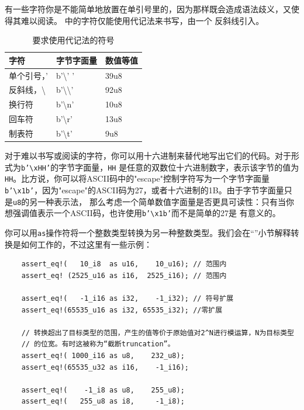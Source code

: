 \medskip
有一些字符你是不能简单地放置在单引号里的，因为那样既会造成语法歧义，又使得其难以阅读。 中的字符仅能使用代记法来书写，由一个
反斜线引入。

\smallskip
\begin{table}[h]
    \small
    \caption{要求使用代记法的符号}\label{TABLE3-6}
    \begin{tabularx}{\linewidth}{X X X}
        \toprule
        \textbf{字符} & \textbf{字节字面量} & \textbf{数值等值} \\
        \midrule
        单个引号，' & b'{\textbackslash}' ' & 39u8 \\
        反斜线，{\textbackslash} & b'\textbackslash\textbackslash' & 92u8 \\
        换行符 & b'{\textbackslash}n' & 10u8 \\
        回车符 & b'{\textbackslash}r' & 13u8 \\
        制表符 & b'{\textbackslash}t' & 9u8 \\
        \bottomrule
    \end{tabularx}
\end{table}

\smallskip
对于难以书写或阅读的字符，你可以用十六进制来替代地写出它们的代码。对于形式为\texttt{b'{\textbackslash}xHH'}的字节字面量，\texttt{HH}
是任意的双数位十六进制数字，表示该字节的值为\texttt{HH}。比方说，你可以将ASCII码中的"escape"控制字符写为一个字节字面量
\texttt{b'{\textbackslash}x1b'}，因为"escape"的ASCII码为27，或者十六进制的1B。由于字节字面量只是\texttt{u8}的另一种表示法，
那么考虑一个简单数值字面量是否更具可读性：只有当你想强调值表示一个ASCII码，也许使用\texttt{b'{\textbackslash}x1b'}而不是简单的27是
有意义的。

\medskip
你可以用\texttt{as}操作符将一个整数类型转换为另一种整数类型。我们会在“”小节解释转换是如何工作的，不过这里有一些示例：
\begin{verbatim}
    assert_eq!(   10_i8  as u16,    10_u16); // 范围内
    assert_eq! (2525_u16 as i16,  2525_i16); // 范围内
    
    assert_eq!(   -1_i16 as i32,    -1_i32); // 符号扩展
    assert_eq!(65535_u16 as i32, 65535_i32); //零扩展

    // 转换超出了目标类型的范围，产生的值等价于原始值对2^N进行模运算，N为目标类型
    // 的位宽。有时这被称为“截断truncation”。
    assert_eq!( 1000_i16 as u8,    232_u8);
    assert_eq!(65535_u32 as i16,    -1_i16);

    assert_eq!(    -1_i8 as u8,    255_u8);
    assert_eq!(   255_u8 as i8,     -1_i8);
\end{verbatim}

